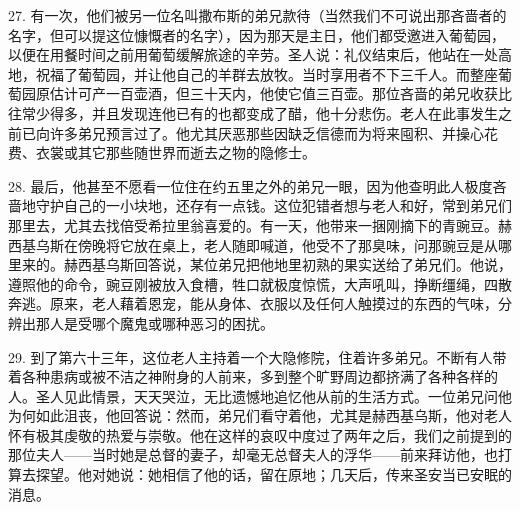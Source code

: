 27. 有一次，他们被另一位名叫撒布斯的弟兄款待（当然我们不可说出那吝啬者的名字，但可以提这位慷慨者的名字），因为那天是主日，他们都受邀进入葡萄园，以便在用餐时间之前用葡萄缓解旅途的辛劳。圣人说：礼仪结束后，他站在一处高地，祝福了葡萄园，并让他自己的羊群去放牧。当时享用者不下三千人。而整座葡萄园原估计可产一百壶酒，但三十天内，他使它值三百壶。那位吝啬的弟兄收获比往常少得多，并且发现连他已有的也都变成了醋，他十分悲伤。老人在此事发生之前已向许多弟兄预言过了。他尤其厌恶那些因缺乏信德而为将来囤积、并操心花费、衣裳或其它那些随世界而逝去之物的隐修士。\par

28. 最后，他甚至不愿看一位住在约五里之外的弟兄一眼，因为他查明此人极度吝啬地守护自己的一小块地，还存有一点钱。这位犯错者想与老人和好，常到弟兄们那里去，尤其去找倍受希拉里翁喜爱的。有一天，他带来一捆刚摘下的青豌豆。赫西基乌斯在傍晚将它放在桌上，老人随即喊道，他受不了那臭味，问那豌豆是从哪里来的。赫西基乌斯回答说，某位弟兄把他地里初熟的果实送给了弟兄们。他说，遵照他的命令，豌豆刚被放入食槽，牲口就极度惊慌，大声吼叫，挣断缰绳，四散奔逃。原来，老人藉着恩宠，能从身体、衣服以及任何人触摸过的东西的气味，分辨出那人是受哪个魔鬼或哪种恶习的困扰。\par

29. 到了第六十三年，这位老人主持着一个大隐修院，住着许多弟兄。不断有人带着各种患病或被不洁之神附身的人前来，多到整个旷野周边都挤满了各种各样的人。圣人见此情景，天天哭泣，无比遗憾地追忆他从前的生活方式。一位弟兄问他为何如此沮丧，他回答说：然而，弟兄们看守着他，尤其是赫西基乌斯，他对老人怀有极其虔敬的热爱与崇敬。他在这样的哀叹中度过了两年之后，我们之前提到的那位夫人——当时她是总督的妻子，却毫无总督夫人的浮华——前来拜访他，也打算去探望。他对她说：她相信了他的话，留在原地；几天后，传来圣安当已安眠的消息。\par

